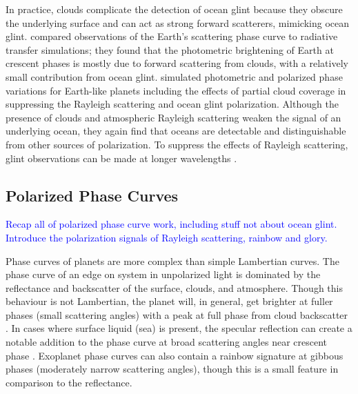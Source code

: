 \documentclass[
    usenatbib,
]{mnras}
\begin{document}
In practice, clouds complicate the detection of ocean glint because they obscure the underlying surface and can act as strong forward scatterers, mimicking ocean glint. \cite{2010ApJ...721L..67R} compared observations of the Earth's scattering phase curve to radiative transfer simulations; they found that the photometric brightening of Earth at crescent phases is mostly due to forward scattering from clouds, with a relatively small contribution from ocean glint.
\cite{Zugger_2010} simulated photometric and polarized phase variations for Earth-like planets including the effects of partial cloud coverage in suppressing the Rayleigh scattering and ocean glint polarization. Although the presence of clouds and atmospheric Rayleigh scattering weaken the signal of an underlying ocean, they again find that oceans are detectable and distinguishable from other sources of polarization. To suppress the effects of Rayleigh scattering, glint observations can be made at longer wavelengths
\citep{Zugger_2011}. 





\subsection{Polarized Phase Curves}
\textcolor{blue}{Recap all of polarized phase curve work, including stuff not about ocean glint. Introduce the polarization signals of Rayleigh scattering, rainbow and glory.}




 Phase curves of planets are more complex than simple Lambertian curves.
 The phase curve of an edge on system in unpolarized light is dominated by the reflectance and backscatter of the surface, clouds, and atmosphere.
 Though this behaviour is not Lambertian, the planet will, in general, get brighter at fuller phases (small scattering angles) with a peak at full phase from cloud backscatter \citep[see, for example,][]{kopparla2018}.
 In cases where surface liquid (sea) is present, the specular reflection can create a notable addition to the phase curve at broad scattering angles near crescent phase \citep{Robinson_2010}.
 Exoplanet phase curves can also contain a rainbow signature at gibbous phases (moderately narrow scattering angles), though this is a small feature in comparison to the reflectance.
\end{document}

